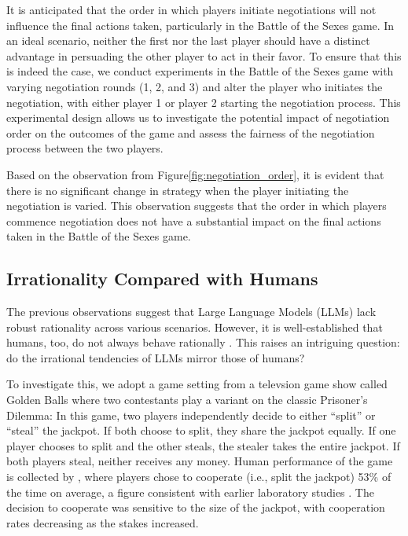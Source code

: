 It is anticipated that the order in which players initiate negotiations will not influence the final actions taken, particularly in the Battle of the Sexes game. In an ideal scenario, neither the first nor the last player should have a distinct advantage in persuading the other player to act in their favor. To ensure that this is indeed the case, we conduct experiments in the Battle of the Sexes game with varying negotiation rounds (1, 2, and 3) and alter the player who initiates the negotiation, with either player 1 or player 2 starting the negotiation process. This experimental design allows us to investigate the potential impact of negotiation order on the outcomes of the game and assess the fairness of the negotiation process between the two players.

Based on the observation from Figure\ref{fig:negotiation_order}, it is evident that there is no significant change in strategy when the player initiating the negotiation is varied. This observation suggests that the order in which players commence negotiation does not have a substantial impact on the final actions taken in the Battle of the Sexes game. 

\subsection{Irrationality Compared with Humans}
The previous observations suggest that Large Language Models (LLMs) lack robust rationality across various scenarios. However, it is well-established that humans, too, do not always behave rationally \cite{dawes1988anomalies, sally1995conversation}. This raises an intriguing question: do the irrational tendencies of LLMs mirror those of humans?

To investigate this, we adopt a game setting from a televsion game show called Golden Balls where two contestants play a variant on the classic Prisoner's Dilemma: In this game, two players independently decide to either ``split'' or ``steal'' the jackpot. If both choose to split, they share the jackpot equally. If one player chooses to split and the other steals, the stealer takes the entire jackpot. If both players steal, neither receives any money. Human performance of the game is collected by \cite{van2012split}, where players chose to cooperate (i.e., split the jackpot) 53\% of the time on average, a figure consistent with earlier laboratory studies \cite{dawes1988anomalies, sally1995conversation}. The decision to cooperate was sensitive to the size of the jackpot, with cooperation rates decreasing as the stakes increased.

